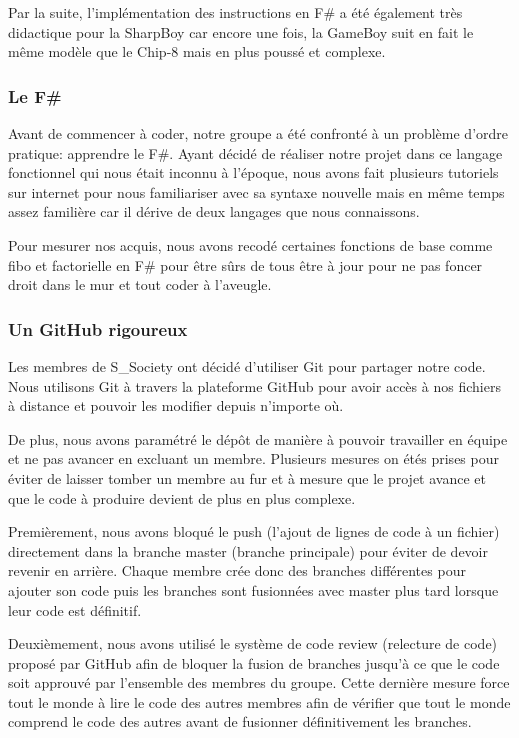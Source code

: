 \documentclass[12pt, a4paper]{article}
\begin{document}
Par la suite, l'implémentation des instructions en F\# a été également très didactique pour la SharpBoy car encore une fois, la GameBoy suit en fait le même modèle que le Chip-8 mais en plus poussé et complexe.

\subsubsection{\large Le F\#}
Avant de commencer à coder, notre groupe a été confronté à un problème d'ordre pratique: apprendre le F\#. Ayant décidé de réaliser notre projet dans ce langage fonctionnel qui nous était inconnu à l'époque, nous avons fait plusieurs tutoriels sur internet pour nous familiariser avec sa syntaxe nouvelle mais en même temps assez familière car il dérive de deux langages que nous connaissons.

Pour mesurer nos acquis, nous avons recodé certaines fonctions de base comme fibo et factorielle en F\# pour être sûrs de tous être à jour pour ne pas foncer droit dans le mur et tout coder à l'aveugle.
\pagebreak 

\subsubsection {\large Un GitHub rigoureux}
Les membres de S\_Society ont décidé d'utiliser Git pour partager notre code. Nous utilisons Git à travers la plateforme GitHub pour avoir accès à nos fichiers à distance et pouvoir les modifier depuis n'importe où.

\bigskip
De plus, nous avons paramétré le dépôt de manière à pouvoir travailler en équipe et ne pas avancer en excluant un membre. Plusieurs mesures on étés prises pour éviter de laisser tomber un membre au fur et à mesure que le projet avance et que le code à produire devient de plus en plus complexe. 

\bigskip
Premièrement, nous avons bloqué le push (l'ajout de lignes de code à un fichier) directement dans la branche master (branche principale) pour éviter de devoir revenir en arrière. Chaque membre crée donc des branches différentes pour ajouter son code puis les branches sont fusionnées avec master plus tard lorsque leur code est définitif. 

\bigskip
Deuxièmement, nous avons utilisé le système de code review (relecture de code) proposé par GitHub afin de bloquer la fusion de branches jusqu'à ce que le code soit approuvé par l'ensemble des membres du groupe. Cette dernière mesure force tout le monde à lire le code des autres membres afin de vérifier que tout le monde comprend le code des autres avant de fusionner définitivement les branches.
\end{document}
